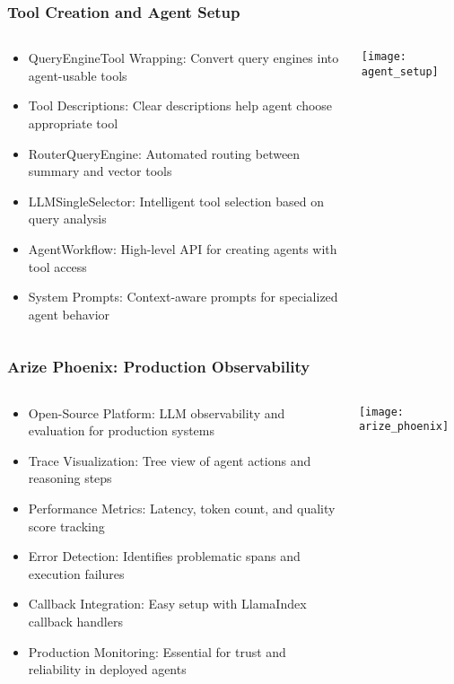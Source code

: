 \begin{frame}[fragile]\frametitle{Tool Creation and Agent Setup}
\begin{columns}
    \begin{column}[T]{0.6\linewidth}
      \begin{itemize}
		\item QueryEngineTool Wrapping: Convert query engines into agent-usable tools
		\item Tool Descriptions: Clear descriptions help agent choose appropriate tool
		\item RouterQueryEngine: Automated routing between summary and vector tools
		\item LLMSingleSelector: Intelligent tool selection based on query analysis
		\item AgentWorkflow: High-level API for creating agents with tool access
		\item System Prompts: Context-aware prompts for specialized agent behavior
	  \end{itemize}
    \end{column}
    \begin{column}[T]{0.4\linewidth}
		\begin{center}
		\texttt{[image: agent\_setup]}
		\end{center}	
    \end{column}
  \end{columns}
\end{frame}

\begin{frame}[fragile]\frametitle{Arize Phoenix: Production Observability}
\begin{columns}
    \begin{column}[T]{0.6\linewidth}
      \begin{itemize}
		\item Open-Source Platform: LLM observability and evaluation for production systems
		\item Trace Visualization: Tree view of agent actions and reasoning steps
		\item Performance Metrics: Latency, token count, and quality score tracking
		\item Error Detection: Identifies problematic spans and execution failures
		\item Callback Integration: Easy setup with LlamaIndex callback handlers
		\item Production Monitoring: Essential for trust and reliability in deployed agents
	  \end{itemize}
    \end{column}
    \begin{column}[T]{0.4\linewidth}
		\begin{center}
		\texttt{[image: arize\_phoenix]}
		\end{center}	
    \end{column}
  \end{columns}
\end{frame}


